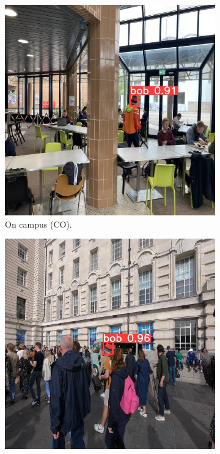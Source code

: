 \documentclass[10pt,conference,compsocconf]{IEEEtran}
\begin{document}
\begin{figure}%
  \centering
  \begin{subfigure}{0.23\textwidth}
    \includegraphics[width=\linewidth]{Image/bob8.jpg}
    \caption{On campus (CO).}
  \end{subfigure}
  \hfil
  \begin{subfigure}{0.23\textwidth}
    \includegraphics[width=\linewidth]{Image/bob4.jpg}

\end{subfigure}
\end{figure}
\end{document}
